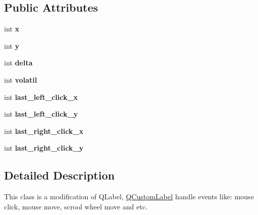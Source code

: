 \subsection*{Public Attributes}
\begin{DoxyCompactItemize}
\item 
\hypertarget{classQCustomLabel_a509c6eb2bc4e80ad72901c1afc976b92}{int {\bfseries x}}\label{classQCustomLabel_a509c6eb2bc4e80ad72901c1afc976b92}

\item 
\hypertarget{classQCustomLabel_a3d3309c76e47ccba7101e5504091804c}{int {\bfseries y}}\label{classQCustomLabel_a3d3309c76e47ccba7101e5504091804c}

\item 
\hypertarget{classQCustomLabel_a64b5c030bb65139b76f063de1d0784bf}{int {\bfseries delta}}\label{classQCustomLabel_a64b5c030bb65139b76f063de1d0784bf}

\item 
\hypertarget{classQCustomLabel_a0eaa0290c071a33d058883a8adc9e0fb}{int {\bfseries volatil}}\label{classQCustomLabel_a0eaa0290c071a33d058883a8adc9e0fb}

\item 
\hypertarget{classQCustomLabel_a5fa4f875b266bd86a552867e60be86da}{int {\bfseries last\-\_\-left\-\_\-click\-\_\-x}}\label{classQCustomLabel_a5fa4f875b266bd86a552867e60be86da}

\item 
\hypertarget{classQCustomLabel_abb541cfa1a5ceb23f29bc08573838bcd}{int {\bfseries last\-\_\-left\-\_\-click\-\_\-y}}\label{classQCustomLabel_abb541cfa1a5ceb23f29bc08573838bcd}

\item 
\hypertarget{classQCustomLabel_a7b13426cb8aedd2d0af1d55502d61325}{int {\bfseries last\-\_\-right\-\_\-click\-\_\-x}}\label{classQCustomLabel_a7b13426cb8aedd2d0af1d55502d61325}

\item 
\hypertarget{classQCustomLabel_a85b2496bc41541923c82ef03894885a7}{int {\bfseries last\-\_\-right\-\_\-click\-\_\-y}}\label{classQCustomLabel_a85b2496bc41541923c82ef03894885a7}

\end{DoxyCompactItemize}


\subsection{Detailed Description}
This class is a modification of Q\-Label, \hyperlink{classQCustomLabel}{Q\-Custom\-Label} handle events like\-: mouse click, mouse move, scrool wheel move and etc. 


